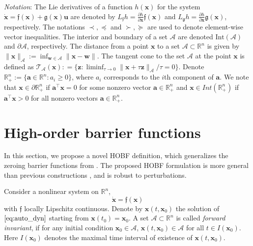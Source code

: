 \documentclass[letterpaper, 10 pt, journal, twoside]{IEEEtran}
\theoremstyle{plain}
\newcommand{\myvar}[1]{\bm{#1}}
\newcommand{\myvarfrak}[1]{\bm{\mathfrak{#1}}}
\newcommand{\myvardot}[1]{\dot{\myvar{#1}}}
\newcommand{\myset}[1]{\mathscr{#1}}
\begin{document}
\textit{Notation}: The Lie derivatives of a function $h(\myvar{x})$ for the system $\myvardot{x} = \myvarfrak{f}(\myvar{x}) + \myvarfrak{g}(\myvar{x}) \myvar{u}$ are denoted by $L_{\mathfrak{f}} h = \tfrac{\partial h}{ \partial \myvar{x}} \myvarfrak{f}(\myvar{x}) $ and $L_{\mathfrak{g}} h = \tfrac{\partial h}{ \partial \myvar{x}} \myvarfrak{g}(\myvar{x})$, respectively.  The notations $\prec, \preceq$ and $\succ, \succeq$ are used to denote element-wise vector inequalities. The interior and boundary of a set $\myset{A}$ are denoted $\text{Int}(\myset{A})$ and $\partial \myset{A}$, respectively. The distance from  a point $\myvar{x}$ to a set $\myset{A}\subset \mathbb{R}^n$ is given by $\| \myvar{x} \|_{\myset{A}} := \inf_{\myvar{w}\in \myset{A}} \| \myvar{x} - \myvar{w} \| $.  The tangent cone  to the set $\myset{A}$ at the point $\myvar{x}$ is defined as $\mathcal{T}_{\myset{A}}(\myvar{x}) : = \{ \myvar{z}: \liminf_{\tau \to 0} \| \myvar{x}+ \tau \myvar{z}  \|_{\myset{A}}/ \tau = 0 \}$.   Denote $ \mathbb{R}^{n}_{+} := \{ \myvar{a} \in \mathbb{R}^n: a_i \ge 0 \} $, where $a_i$ corresponds to the $i$th component of $\myvar{a}$. We note that $ \myvar{x}\in \partial  \mathbb{R}^{n}_{+} $ if $ \myvar{a}^\top \myvar{x} = 0 $ for some nonzero vector $ \myvar{a} \in \mathbb{R}^{n}_{+} $ and $ \myvar{x}\in Int( \mathbb{R}^{n}_{+}) $ if $ \myvar{a}^\top \myvar{x} >0 $ for all nonzero vectors $ \myvar{a} \in \mathbb{R}^{n}_{+} $.

\section{High-order barrier functions}
In this section, we {propose} a novel HOBF definition, which {generalizes} the zeroing barrier functions from \cite{Xu2015a,Ames2017}. The proposed HOBF formulation is more general {than} previous constructions \cite{xu2018constrained,xiao2019control,wences2020correct}, and {is robust} to perturbations.
 
Consider a nonlinear system on $\mathbb{R}^n$,
\begin{equation}\label{eq:auto_dyn}
\dot{\myvar{x}} = \myvarfrak{f}(\myvar{x})
\end{equation}
with $ \myvarfrak{f} $ locally Lipschitz continuous. Denote by $ \myvar{x}(t,\myvar{x}_0) $ the solution of $ \eqref{eq:auto_dyn} $ starting from $\myvar{x}(t_0) = \myvar{x}_0$.  A set $\myset{A} \subset \mathbb{R}^n$ is called \textit{forward invariant}, if for 
any initial condition $ \myvar{x}_0 \in \myset{A}  $, $\myvar{x}(t,\myvar{x}_0)  \in \myset{A}$ for all $t \in I(\myvar{x}_0 )$. Here $I(\myvar{x}_0 )$ denotes the maximal time interval of existence of $\myvar{x}(t,\myvar{x}_0) $.
\end{document}
